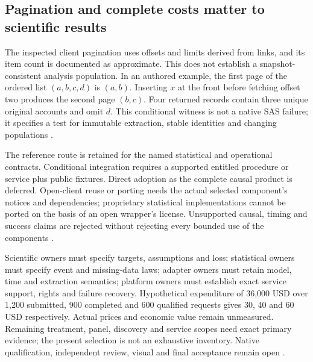 \subsection{Pagination and complete costs matter to scientific results}
The inspected client pagination uses offsets and limits derived from links,
and its item count is documented as approximate. This does not establish
a snapshot-consistent analysis population. In an authored example, the
first page of the ordered list $(a,b,c,d)$ is $(a,b)$. Inserting $x$ at the
front before fetching offset two produces the second page $(b,c)$. Four
returned records contain three unique original accounts and omit $d$.
This conditional witness is not a native SAS failure; it specifies a
test for immutable extraction, stable identities and changing populations
\cite{exec23_workflow_delegates_sasctl,exec24_sas_choice}.

The reference route is retained for the named statistical and operational
contracts. Conditional integration requires a supported entitled procedure
or service plus public fixtures. Direct adoption as the complete causal
product is deferred. Open-client reuse or porting needs the actual selected
component's notices and dependencies; proprietary statistical implementations
cannot be ported on the basis of an open wrapper's license. Unsupported
causal, timing and success claims are rejected without rejecting every
bounded use of the components \cite{exec24_sas_choice}.

Scientific owners must specify targets, assumptions and loss; statistical
owners must specify event and missing-data laws; adapter owners must retain
model, time and extraction semantics; platform owners must establish exact
service support, rights and failure recovery. Hypothetical expenditure of
36,000 USD over 1,200 submitted, 900 completed and 600 qualified requests
gives 30, 40 and 60 USD respectively. Actual prices and economic value
remain unmeasured. Remaining treatment, panel, discovery and service scopes
need exact primary evidence; the present selection is not an exhaustive
inventory. Native qualification, independent review, visual and final
acceptance remain open \cite{exec24_sas_choice}.
